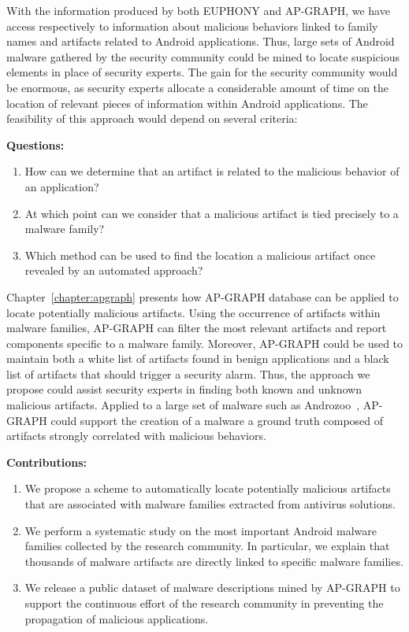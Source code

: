 With the information produced by both EUPHONY and AP-GRAPH, we have access respectively to information about malicious behaviors linked to family names and artifacts related to Android applications.
Thus, large sets of Android malware gathered by the security community could be mined to locate suspicious elements in place of security experts.
The gain for the security community would be enormous, as security experts allocate a considerable amount of time on the location of relevant pieces of information within Android applications.
The feasibility of this approach would depend on several criteria:

\begin{mdframed}[hidealllines=true,nobreak=true]
\textbf{Questions:}

\begin{enumerate}
	\item How can we determine that an artifact is related to the malicious behavior of an application?
	\item At which point can we consider that a malicious artifact is tied precisely to a malware family?
	\item Which method can be used to find the location a malicious artifact once revealed by an automated approach?
\end{enumerate}
\end{mdframed}

Chapter~\ref{chapter:apgraph} presents how AP-GRAPH database can be applied to locate potentially malicious artifacts.
Using the occurrence of artifacts within malware families, AP-GRAPH can filter the most relevant artifacts and report components specific to a malware family.
Moreover, AP-GRAPH could be used to maintain both a white list of artifacts found in benign applications and a black list of artifacts that should trigger a security alarm.
Thus, the approach we propose could assist security experts in finding both known and unknown malicious artifacts.
Applied to a large set of malware such as Androzoo~\cite{allix_androzoo:_2016}, AP-GRAPH could support the creation of a malware a ground truth composed of artifacts strongly correlated with malicious behaviors.

\begin{mdframed}[hidealllines=true,nobreak=true]
\textbf{Contributions:}

\begin{enumerate}
	\item We propose a scheme to automatically locate potentially malicious artifacts that are associated with malware families extracted from antivirus solutions.
	\item We perform a systematic study on the most important Android malware families collected by the research community. In particular, we explain that thousands of malware artifacts are directly linked to specific malware families.
	\item We release a public dataset of malware descriptions mined by AP-GRAPH to support the continuous effort of the research community in preventing the propagation of malicious applications.
\end{enumerate}
\end{mdframed}
